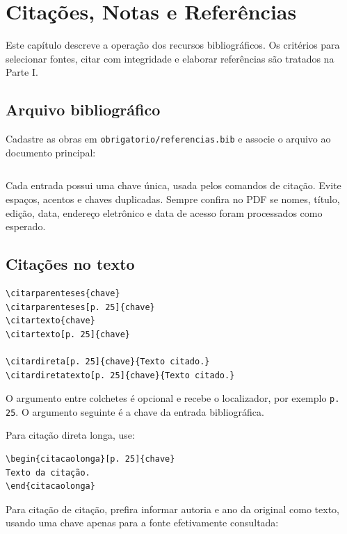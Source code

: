 \chapter{Citações, Notas e Referências}

Este capítulo descreve a operação dos recursos bibliográficos. Os critérios para selecionar fontes, citar com integridade e elaborar referências são tratados na Parte I.

\section{Arquivo bibliográfico}

Cadastre as obras em \texttt{obrigatorio/referencias.bib} e associe o arquivo ao documento principal:

\begin{lstlisting}

\end{lstlisting}

Cada entrada possui uma chave única, usada pelos comandos de citação. Evite espaços, acentos e chaves duplicadas. Sempre confira no PDF se nomes, título, edição, data, endereço eletrônico e data de acesso foram processados como esperado.

\section{Citações no texto}

\begin{lstlisting}
\citarparenteses{chave}
\citarparenteses[p. 25]{chave}
\citartexto{chave}
\citartexto[p. 25]{chave}

\citardireta[p. 25]{chave}{Texto citado.}
\citardiretatexto[p. 25]{chave}{Texto citado.}
\end{lstlisting}

O argumento entre colchetes é opcional e recebe o localizador, por exemplo \texttt{p. 25}. O argumento seguinte é a chave da entrada bibliográfica.

Para citação direta longa, use:

\begin{lstlisting}
\begin{citacaolonga}[p. 25]{chave}
Texto da citação.
\end{citacaolonga}
\end{lstlisting}

Para citação de citação, prefira informar autoria e ano da original como texto,
usando uma chave apenas para a fonte efetivamente consultada:


